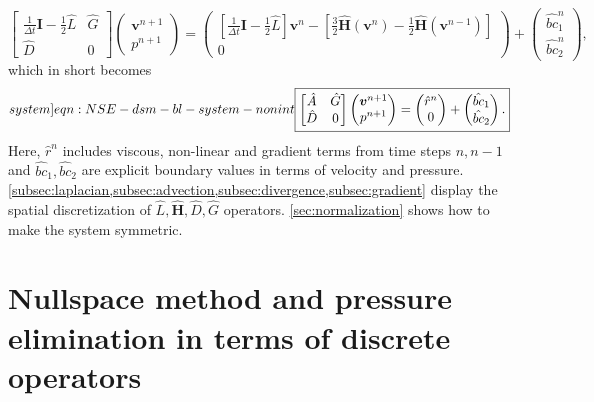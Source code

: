 \documentclass{article}
\numberwithin{equation}{section}
\begin{document}
	\begin{equation}
		\begin{bmatrix}
			\frac{1}{\Delta t}\mathbf{I}-\frac{1}{2}\hat{L} & \hat{G} \\
			\hat{D} & 0
		\end{bmatrix}
		\begin{pmatrix}
			\boldsymbol{v}^{n+1} \\ 
			p^{n+1}
		\end{pmatrix}
		=
		\begin{pmatrix}
			\left[\frac{1}{\Delta t}\mathbf{I}-\frac{1}{2}\hat{L}\right] \boldsymbol{v}^n - \left[\frac{3}{2}\hat{\mathbf{H}}(\boldsymbol{v}^n) - \frac{1}{2}\hat{\mathbf{H}}(\boldsymbol{v}^{n-1})\right]\\
			0
		\end{pmatrix}
		+
		\begin{pmatrix}
			\hat{bc}_1^n\\
			\hat{bc}_2^n
		\end{pmatrix},
	\end{equation}	
which in short becomes
\begin{equation}\label[system]{eqn:NSE-dsm-bl-system-nonint}
	\boxed{\begin{bmatrix}
		\hat{A} & \hat{G} \\
		\hat{D} & 0
	\end{bmatrix}
	\begin{pmatrix}
		\boldsymbol{v}^{n+1} \\ 
		p^{n+1}
	\end{pmatrix}
	=
	\begin{pmatrix}
		\hat{r}^n \\
		0
	\end{pmatrix}
	+
	\begin{pmatrix}
		\hat{bc}_1\\
		\hat{bc}_2
	\end{pmatrix}.}
\end{equation}
Here, $\hat{r}^n$ includes viscous, non-linear and gradient terms from time steps $n,n-1$ and $\hat{bc}_1,\hat{bc}_2$ are explicit boundary values in terms of velocity and pressure. \cref{subsec:laplacian,subsec:advection,subsec:divergence,subsec:gradient} display the spatial discretization of $\hat{L},\hat{\mathbf{H}},\hat{D},\hat{G}$ operators. \cref{sec:normalization} shows how to make the system symmetric.





\pagebreak
\section{Nullspace method and pressure elimination in terms of discrete operators}\label{sec:nullspace-method}
\end{document}
